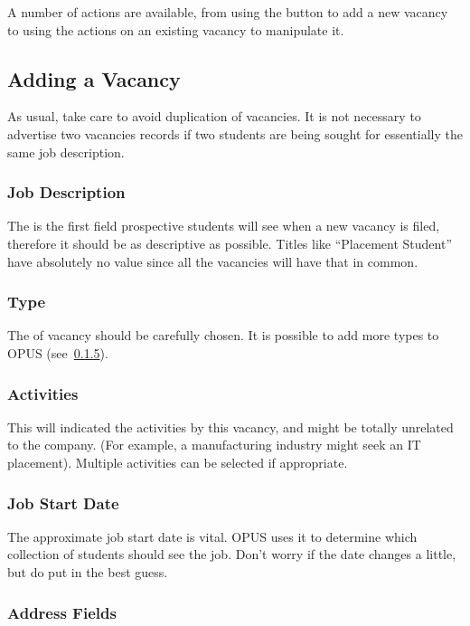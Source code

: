 \documentclass[12 pt]{book}
\begin{document}
A number of actions are available, from using the  button to
add a new vacancy to using the actions on an existing vacancy to manipulate
it.

\subsection{Adding a Vacancy}

As usual, take care to avoid duplication of vacancies. It is not necessary to
advertise two vacancies records if two students are being sought for 
essentially the same job description.

\subsubsection{Job Description}

The  is the first field prospective students will
see when a new vacancy is filed, therefore it should be as descriptive as
possible. Titles like ``Placement Student'' have absolutely no value since all
the vacancies will have that in common.

\subsubsection{Type}

The  of vacancy should be carefully chosen. It is possible to
add more types to OPUS (see~\ref{}).

\subsubsection{Activities}

This will indicated the activities by this vacancy, and might be totally
unrelated to the company. (For example, a manufacturing industry might seek
an IT placement). Multiple activities can be selected if appropriate.

\subsubsection{Job Start Date}

The approximate job start date is vital. OPUS uses it to determine which
collection of students should see the job. Don't worry if the date changes a
little, but do put in the best guess.

\subsubsection{Address Fields}
\end{document}
